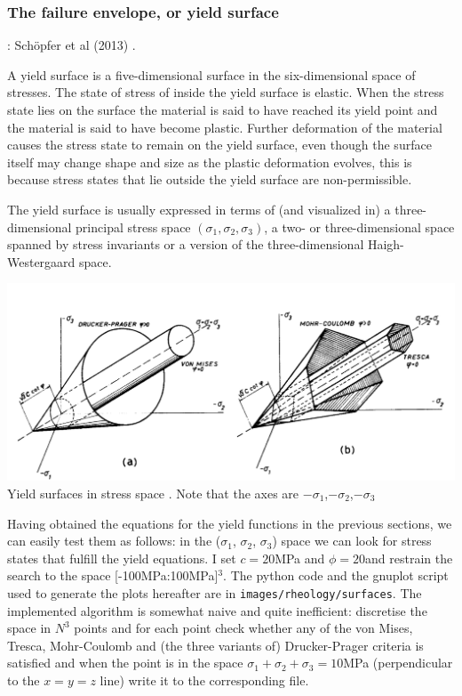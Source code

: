 
\subsubsection{The failure envelope, or yield surface}
\label{ss:envelope} 

\Literature: Sch{\"o}pfer et al (2013) \cite{sccm13}.

A yield surface is a five-dimensional surface in the six-dimensional space of stresses. 
The state of stress of inside the yield surface is elastic. 
When the stress state lies on the surface the material is said to have reached its yield point 
and the material is said to have become plastic. Further deformation of the material causes 
the stress state to remain on the yield surface, even though the surface itself may change shape and 
size as the plastic deformation evolves, this is because stress states that lie outside the yield surface are non-permissible.

The yield surface is usually expressed in terms of (and visualized in) a three-dimensional principal stress space $(\sigma_1,\sigma_2,\sigma_3)$, a two- or three-dimensional space spanned by stress invariants 
or a version of the three-dimensional Haigh-Westergaard space. 

\begin{center}
\includegraphics[width=14cm]{images/rheology/surfaces}\\
{\captionfont Yield surfaces in stress space \cite{zico74}. Note that 
the axes are $-\sigma_1$,$-\sigma_2$,$-\sigma_3$}
\end{center} 

Having obtained the equations for the yield functions in the previous sections, we can easily test
them as follows: in the ($\sigma_1$, $\sigma_2$, $\sigma_3$) space we can look for stress states 
that fulfill the yield equations. I set $c=20$MPa and $\phi=20$\degree and restrain 
the search to the space [-100MPa:100MPa]$^3$.
The python code and the gnuplot script used to generate the plots hereafter 
are in {\tt images/rheology/surfaces}. The implemented algorithm is somewhat  
naive and quite inefficient: discretise the space in $N^3$ points and for each point 
check whether any of the von Mises, Tresca, Mohr-Coulomb and (the three variants of) Drucker-Prager 
criteria is satisfied and when the point is in the space $\sigma_1+\sigma_2+\sigma_3=10$MPa 
(perpendicular to the $x=y=z$ line) write it to the corresponding file.

